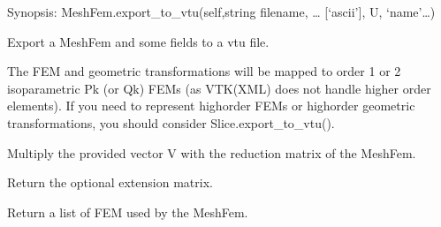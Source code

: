 \documentclass[a4paper,11pt,english]{sphinxmanual}
\begin{document}
\begin{fulllineitems}
\begin{fulllineitems}
\end{fulllineitems}


\begin{fulllineitems}
\label{\detokenize{python/cmdref_MeshFem:getfem.MeshFem.export_to_vtu}}
Synopsis: MeshFem.export\_to\_vtu(self,string filename, … {[}‘ascii’{]}, U, ‘name’…)

Export a MeshFem and some fields to a vtu file.

The FEM and geometric transformations will be mapped to order 1
or 2 isoparametric Pk (or Qk) FEMs (as VTK(XML) does not handle higher
order elements). If you need to represent high\sphinxhyphen{}order FEMs or
high\sphinxhyphen{}order geometric transformations, you should consider
Slice.export\_to\_vtu().

\end{fulllineitems}


\begin{fulllineitems}
\label{\detokenize{python/cmdref_MeshFem:getfem.MeshFem.extend_vector}}
Multiply the provided vector V with the reduction matrix of the MeshFem.

\end{fulllineitems}


\begin{fulllineitems}
\label{\detokenize{python/cmdref_MeshFem:getfem.MeshFem.extension_matrix}}
Return the optional extension matrix.

\end{fulllineitems}


\begin{fulllineitems}
\label{\detokenize{python/cmdref_MeshFem:getfem.MeshFem.fem}}
Return a list of FEM used by the MeshFem.


\end{fulllineitems}
\end{fulllineitems}
\end{document}

